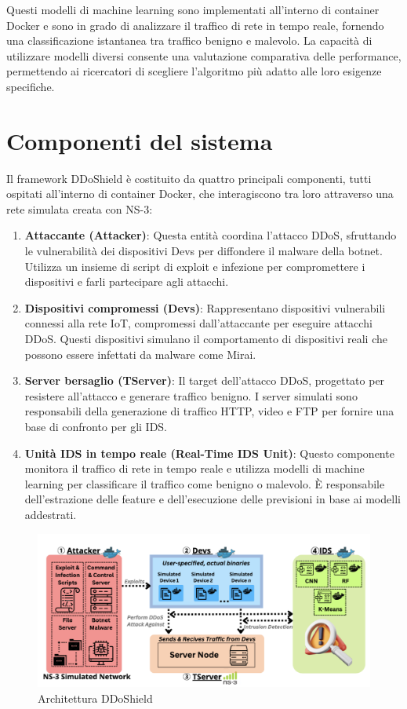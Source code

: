 Questi modelli di machine learning sono implementati all'interno di container Docker e sono in grado di analizzare il traffico di rete in tempo reale, fornendo una classificazione istantanea tra traffico benigno e malevolo. La capacità di utilizzare modelli diversi consente una valutazione comparativa delle performance, permettendo ai ricercatori di scegliere l'algoritmo più adatto alle loro esigenze specifiche.

\section{Componenti del sistema}

Il framework DDoShield è costituito da quattro principali componenti, tutti ospitati all'interno di container Docker, che interagiscono tra loro attraverso una rete simulata creata con NS-3:

\begin{enumerate}
    \item \textbf{Attaccante (Attacker)}: Questa entità coordina l'attacco DDoS, sfruttando le vulnerabilità dei dispositivi Devs per diffondere il malware della botnet. Utilizza un insieme di script di exploit e infezione per compromettere i dispositivi e farli partecipare agli attacchi.
    \item \textbf{Dispositivi compromessi (Devs)}: Rappresentano dispositivi vulnerabili connessi alla rete IoT, compromessi dall'attaccante per eseguire attacchi DDoS. Questi dispositivi simulano il comportamento di dispositivi reali che possono essere infettati da malware come Mirai.
    \item \textbf{Server bersaglio (TServer)}: Il target dell'attacco DDoS, progettato per resistere all'attacco e generare traffico benigno. I server simulati sono responsabili della generazione di traffico HTTP, video e FTP per fornire una base di confronto per gli IDS.
    \item \textbf{Unità IDS in tempo reale (Real-Time IDS Unit)}: Questo componente monitora il traffico di rete in tempo reale e utilizza modelli di machine learning per classificare il traffico come benigno o malevolo. È responsabile dell’estrazione delle feature e dell’esecuzione delle previsioni in base ai modelli addestrati.
\end{enumerate}

\begin{figure}[htbp]
\centering
\includegraphics[scale= 0.6]{UNINA_MSc_Thesis_Project/img/chapterSimulatore/DDoShield.png}
  \caption{Architettura DDoShield}
\end{figure}


